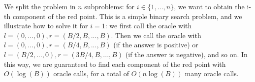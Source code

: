 \documentclass[11pt]{article}
\begin{document}
\begin{enumerate}[1)]
\begin{solution}
We split the problem in $n$ subproblems: for $i∈\{1,...,n\}$, we want to obtain the i-th component
of the red point. This is a simple binary search problem, and we illustrate how to solve it for $i= 1$:
we first call the oracle with $l = (0,...,0),r = (B/2,B,...,B)$. Then we call the oracle with $l=
(0,...,0),r = (B/4,B,...,B)$ (if the answer is positive) or $l = (B/2,...,0),r = (3B/4,B,...,B)$
(if the answer is negative), and so on. In this way, we are guaranteed to find each component of the
red point with $O(\log(B))$ oracle calls, for a total of $O(n\log(B))$ many oracle calls.
\end{solution}

\end{enumerate}




  
\end{document}
